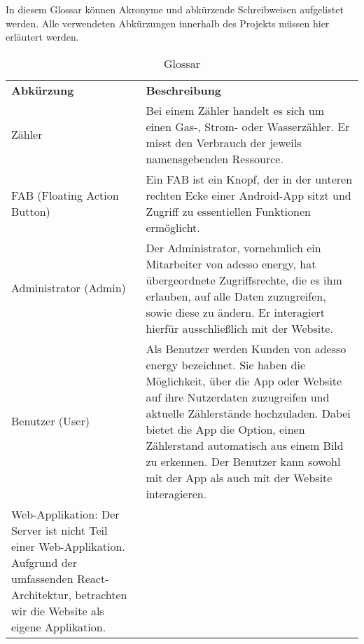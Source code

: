 \begin{tcolorbox}
In diesem Glossar können Akronyme und abkürzende Schreibweisen aufgelistet werden. 
Alle verwendeten Abkürzungen innerhalb des Projekts müssen hier erläutert werden.
\end{tcolorbox}

\begin{table}[h]
	\centering
	\begin{tabularx}{\textwidth}{X X}
		\rowcolor[HTML]{C0C0C0} 
		\textbf{Abkürzung} & \textbf{Beschreibung} \\
		Zähler & Bei einem Zähler handelt es sich um einen Gas-, Strom- oder Wasserzähler. Er misst den Verbrauch der jeweils namensgebenden Ressource. \\
		\rowcolor[HTML]{E7E7E7} 
		FAB (Floating Action Button) & Ein FAB ist ein Knopf, der in der unteren rechten Ecke einer Android-App sitzt und Zugriff zu essentiellen Funktionen ermöglicht. \\
		Administrator (Admin) & Der Administrator, vornehmlich ein Mitarbeiter von adesso energy, hat übergeordnete Zugriffsrechte, die es ihm erlauben, auf alle Daten zuzugreifen, sowie diese zu ändern. Er interagiert hierfür ausschließlich mit der Website. \\
		\rowcolor[HTML]{E7E7E7} 
		Benutzer (User) & Als Benutzer werden Kunden von adesso energy bezeichnet. Sie haben die Möglichkeit, über die App oder Website auf ihre Nutzerdaten zuzugreifen und aktuelle Zählerstände hochzuladen. Dabei bietet die App die Option, einen Zählerstand automatisch aus einem Bild zu erkennen. Der Benutzer kann sowohl mit der App als auch mit der Website interagieren. \\
		Web-Applikation: Der Server ist nicht Teil einer Web-Applikation. Aufgrund der umfassenden React-Architektur, betrachten wir die Website als eigene Applikation.
		
	\end{tabularx}
	\caption{Glossar}
	\label{table:glossar}
\end{table}